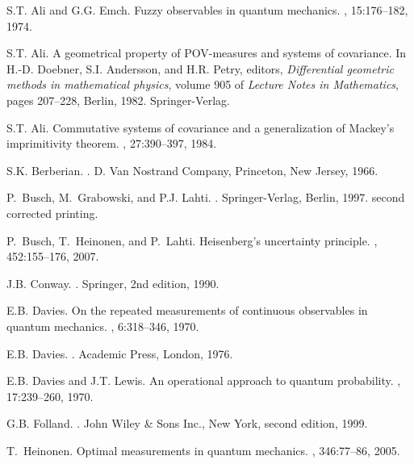 \documentclass[12pt]{amsart}
\theoremstyle{definition}
\begin{document}
\begin{thebibliography}{HLY04}

S.T. Ali and G.G. Emch.
\newblock Fuzzy observables in quantum mechanics.
, 15:176--182, 1974.

S.T. Ali.
\newblock A geometrical property of {POV}-measures and systems of covariance.
\newblock In H.-D. Doebner, S.I. Andersson, and H.R. Petry, editors, {\em
  Differential geometric methods in mathematical physics}, volume 905 of {\em
  Lecture Notes in Mathematics}, pages 207--228, Berlin, 1982. Springer-Verlag.

S.T. Ali.
\newblock Commutative systems of covariance and a generalization of {M}ackey's
  imprimitivity theorem.
, 27:390--397, 1984.

S.K. Berberian.
.
\newblock D. Van Nostrand Company, Princeton, New Jersey, 1966.

P.~Busch, M.~Grabowski, and P.J. Lahti.
.
\newblock Springer-Verlag, Berlin, 1997.
\newblock second corrected printing.

P.~Busch, T.~Heinonen, and P.~Lahti.
\newblock Heisenberg's uncertainty principle.
, 452:155--176, 2007.

J.B. Conway.
.
\newblock Springer, 2nd edition, 1990.

E.B. Davies.
\newblock On the repeated measurements of continuous observables in quantum
  mechanics.
, 6:318--346, 1970.

E.B. Davies.
.
\newblock Academic Press, London, 1976.

E.B. Davies and J.T. Lewis.
\newblock An operational approach to quantum probability.
, 17:239--260, 1970.

G.B. Folland.
.
\newblock John Wiley \& Sons Inc., New York, second edition, 1999.

T.~Heinonen.
\newblock Optimal measurements in quantum mechanics.
, 346:77--86, 2005.


\end{thebibliography}
\end{document}
